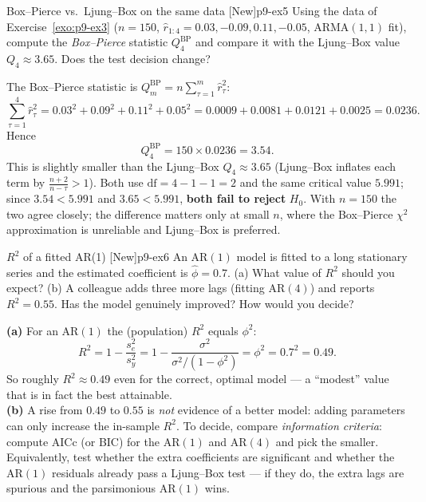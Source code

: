 \begin{exercise}{Box--Pierce vs.\ Ljung--Box on the same data \quad\textnormal{[New]}}{p9-ex5}
Using the data of Exercise~\ref{exo:p9-ex3} ($n=150$, $\hat r_{1:4}=
0.03,-0.09,0.11,-0.05$, ARMA$(1,1)$ fit), compute the \emph{Box--Pierce}
statistic $Q_4^{\mathrm{BP}}$ and compare it with the Ljung--Box value
$Q_4\approx3.65$. Does the test decision change?
\end{exercise}
\begin{solution}
The Box--Pierce statistic is $Q_m^{\mathrm{BP}}=n\sum_{\tau=1}^m\hat r_\tau^2$:
\[
\sum_{\tau=1}^4 \hat r_\tau^2 = 0.03^2+0.09^2+0.11^2+0.05^2
= 0.0009+0.0081+0.0121+0.0025 = 0.0236 .
\]
Hence
\[
Q_4^{\mathrm{BP}} = 150\times 0.0236 = 3.54 .
\]
This is slightly smaller than the Ljung--Box $Q_4\approx3.65$ (Ljung--Box
inflates each term by $\frac{n+2}{n-\tau}>1$). Both use $\mathrm{df}=4-1-1=2$ and
the same critical value $5.991$; since $3.54<5.991$ and $3.65<5.991$, \textbf{both
fail to reject} $H_0$. With $n=150$ the two agree closely; the difference matters
only at small $n$, where the Box--Pierce $\chi^2$ approximation is unreliable and
Ljung--Box is preferred.
\end{solution}

\begin{exercise}{$R^2$ of a fitted AR(1) \quad\textnormal{[New]}}{p9-ex6}
An AR$(1)$ model is fitted to a long stationary series and the estimated
coefficient is $\hat\phi=0.7$. (a) What value of $R^2$ should you expect?
(b) A colleague adds three more lags (fitting AR$(4)$) and reports
$R^2=0.55$. Has the model genuinely improved? How would you decide?
\end{exercise}
\begin{solution}
\textbf{(a)} For an AR$(1)$ the (population) $R^2$ equals $\phi^2$:
\[
R^2 = 1-\frac{s_e^2}{s_y^2}
    = 1-\frac{\sigma^2}{\sigma^2/(1-\phi^2)} = \phi^2 = 0.7^2 = 0.49 .
\]
So roughly $R^2\approx 0.49$ even for the correct, optimal model --- a
``modest'' value that is in fact the best attainable.\\
\textbf{(b)} A rise from $0.49$ to $0.55$ is \emph{not} evidence of a better
model: adding parameters can only increase the in-sample $R^2$. To decide,
compare \emph{information criteria}: compute AICc (or BIC) for the AR$(1)$ and
AR$(4)$ and pick the smaller. Equivalently, test whether the extra coefficients
are significant and whether the AR$(1)$ residuals already pass a Ljung--Box test
--- if they do, the extra lags are spurious and the parsimonious AR$(1)$ wins.
\end{solution}

